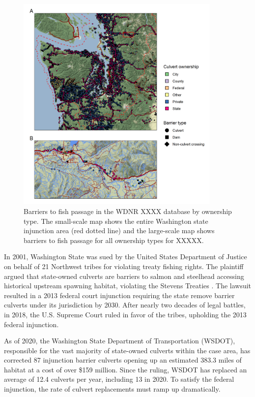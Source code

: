\documentclass[12pt]{elsarticle}
\begin{document}
\begin{figure}
\includegraphics[width=10cm]{figures/fig_mapconcrete.png}
\caption{Barriers to fish passage in the WDNR XXXX database by ownership type. The small-scale map shows the entire Washington state injunction area (red dotted line) and the large-scale map shows barriers to fish passage for all ownership types for XXXXX.\label{fig:barrierMap}}
\end{figure}%



 In 2001, Washington State was sued by the United States Department of Justice on behalf of 21 Northwest tribes for violating treaty fishing rights. The plaintiff argued that state-owned culverts are barriers to salmon and steelhead accessing historical upstream spawning habitat, violating the Stevens Treaties \citep{hickey2018highway}. The lawsuit resulted in a 2013 federal court injunction requiring the state remove barrier culverts under its jurisdiction by 2030. After nearly two decades of legal battles, in 2018, the U.S. Supreme Court ruled in favor of the tribes, upholding the 2013 federal injunction. 

As of 2020, the Washington State Department of Transportation (WSDOT), responsible for the vast majority of state-owned culverts within the case area, has corrected 87 injunction barrier culverts opening up an estimated 383.3 miles of habitat at a cost of over \$159 million. Since the ruling, WSDOT has replaced an average of 12.4 culverts per year, including 13 in 2020. To satisfy the federal injunction, the rate of culvert replacements must ramp up dramatically. 
\end{document}
